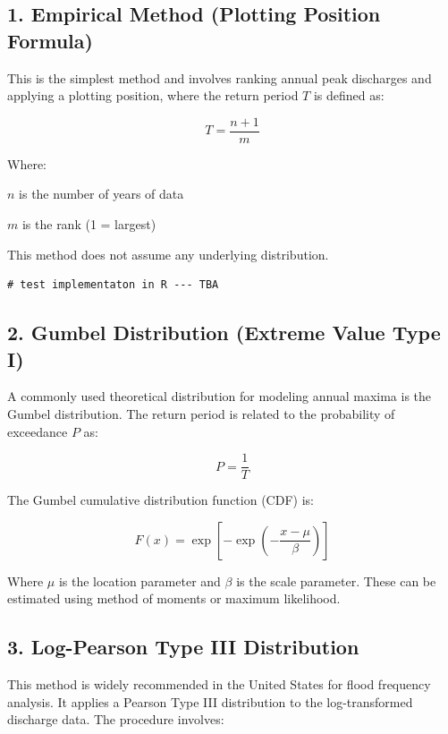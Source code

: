\documentclass{tufte-handout}\usepackage[]{graphicx}\usepackage[]{xcolor}
\newenvironment{itemize*}%
  {\begin{itemize}%
    \setlength{\itemsep}{0pt}%
    \setlength{\parskip}{0pt}}%
  {\end{itemize}}
\begin{document}
\subsection{1. Empirical Method (Plotting Position Formula)}

This is the simplest method and involves ranking annual peak discharges and applying a plotting position, where the return period \( T \) is defined as:

\[
T = \frac{n + 1}{m}
\]


\noindent Where:
\begin{itemize*}
  \item \( n \) is the number of years of data
  \item \( m \) is the rank (1 = largest)
\end{itemize*}

This method does not assume any underlying distribution.

\begin{verbatim}
# test implementaton in R --- TBA

\end{verbatim}

\subsection{2. Gumbel Distribution (Extreme Value Type I)}

A commonly used theoretical distribution for modeling annual maxima is the Gumbel distribution. The return period is related to the probability of exceedance \( P \) as:

\[
P = \frac{1}{T}
\]

The Gumbel cumulative distribution function (CDF) is:

\[
F(x) = \exp\left[-\exp\left(-\frac{x - \mu}{\beta}\right)\right]
\]

Where \( \mu \) is the location parameter and \( \beta \) is the scale parameter. These can be estimated using method of moments or maximum likelihood.

\subsection{3. Log-Pearson Type III Distribution}

This method is widely recommended in the United States for flood frequency analysis. It applies a Pearson Type III distribution to the log-transformed discharge data. The procedure involves:
\end{document}

